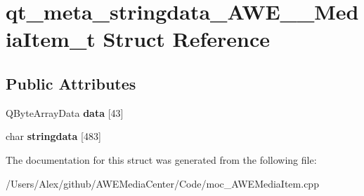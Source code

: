 \hypertarget{structqt__meta__stringdata___a_w_e_____media_item__t}{\section{qt\-\_\-meta\-\_\-stringdata\-\_\-\-A\-W\-E\-\_\-\-\_\-\-Media\-Item\-\_\-t Struct Reference}
\label{structqt__meta__stringdata___a_w_e_____media_item__t}
}
\subsection*{Public Attributes}
\begin{DoxyCompactItemize}
\item 
\hypertarget{structqt__meta__stringdata___a_w_e_____media_item__t_a6bcebb356aa6a9dcd96b80385f95a8fd}{Q\-Byte\-Array\-Data {\bfseries data} \mbox{[}43\mbox{]}}\label{structqt__meta__stringdata___a_w_e_____media_item__t_a6bcebb356aa6a9dcd96b80385f95a8fd}

\item 
\hypertarget{structqt__meta__stringdata___a_w_e_____media_item__t_a5faedd52fcbcaab28f321e062ee32e9b}{char {\bfseries stringdata} \mbox{[}483\mbox{]}}\label{structqt__meta__stringdata___a_w_e_____media_item__t_a5faedd52fcbcaab28f321e062ee32e9b}

\end{DoxyCompactItemize}


The documentation for this struct was generated from the following file\-:\begin{DoxyCompactItemize}
\item 
/\-Users/\-Alex/github/\-A\-W\-E\-Media\-Center/\-Code/moc\-\_\-\-A\-W\-E\-Media\-Item.\-cpp\end{DoxyCompactItemize}
